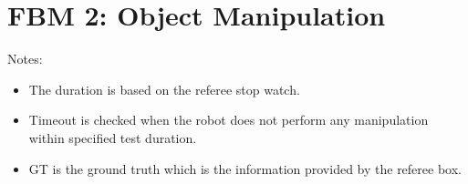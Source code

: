 \section*{FBM 2: Object Manipulation}


\noindent Notes:
\begin{itemize}
\item The duration is based on the referee stop watch.
\item Timeout is checked when the robot does not perform any manipulation within specified test duration.
\item GT is the ground truth which is the information provided by the referee box. 
\end{itemize}

\vspace{0.5cm}


\newpage
{}


